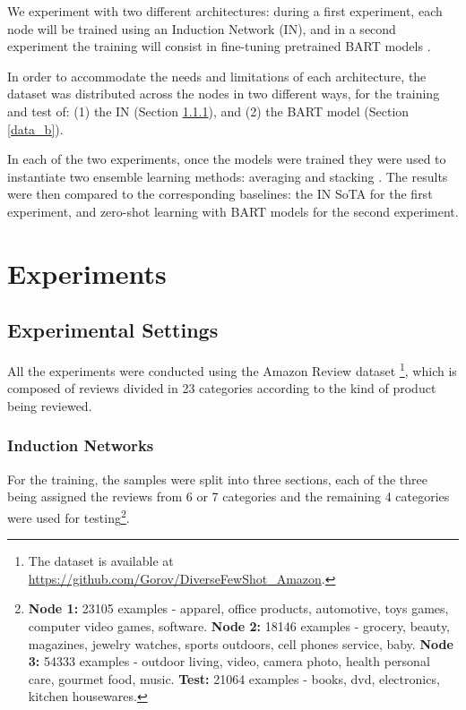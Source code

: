\documentclass{esannV2}
\begin{document}
We experiment with two different architectures: during a first experiment, each node will be trained using an Induction Network (IN)\cite{geng-etal-2019-induction}, and in a second experiment the training will consist in fine-tuning pretrained BART models \cite{lewis2019bart}.

In order to accommodate the needs and limitations of each architecture, the dataset was distributed across the nodes in two different ways, for the training and test of: (1) the IN (Section \ref{data_in}), and (2) the BART model (Section \ref{data_b}).

In each of the two experiments, once the models were trained they were used to instantiate two ensemble learning methods: averaging \cite{fedavg} and stacking \cite{wolpert}. The results were then compared to the corresponding baselines: the IN SoTA for the first experiment, and zero-shot \cite{zero} learning with BART models for the second experiment. 
    
    

        
\section{Experiments}
        
    \subsection{Experimental Settings}
    
    All the experiments were conducted using the Amazon Review dataset \cite{yu2018diverse}\footnote{The dataset is available at \url{https://github.com/Gorov/DiverseFewShot_Amazon}.}, which is composed of reviews divided in 23 categories according to the kind of product being reviewed.
            
        \subsubsection{Induction Networks}
        \label{data_in}
        For the training, the samples were split into three sections, each of the three being assigned the reviews from 6 or 7 categories and the remaining 4 categories were used for testing\footnote{
        \textbf{Node 1:} 23105 examples - apparel, office products, automotive, toys games, computer video games, software.
        \textbf{Node 2:} 18146 examples - grocery, beauty, magazines, jewelry watches, sports outdoors, cell phones service, baby.
        \textbf{Node 3:} 54333 examples - outdoor living, video, camera photo, health personal care, gourmet food, music.
        \textbf{Test:} 21064 examples - books, dvd, electronics, kitchen housewares.}.
        
\end{document}
